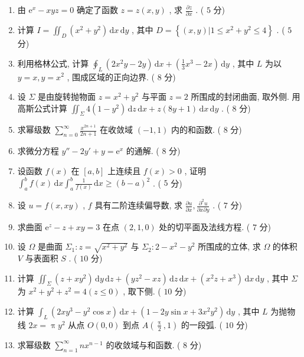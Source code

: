 \documentclass[cn,11pt,fancy,hide]{elegantbook}
\newcommand{\ee}{\mathrm{e}}
\newcommand{\dd}{\,\mathrm{d}}
\renewcommand{\leq}{\leqslant}
\renewcommand{\geq}{\geqslant}
\begin{document}
\begin{enumerate}
	\item 由 $\ee^{x}-x y z=0$ 确定了函数 $z=z(x,y)$ , 求 $\frac{\partial z}{\partial x}$ . ( $5$ 分)
	
	\item 计算 $I=\iint_{D}\left(x^{2}+y^{2}\right) \dd x \dd y$ , 其中 $D=\left\{(x, y) | 1 \leq x^{2}+y^{2} \leq 4\right\}$ . ( $5$ 分)
	
	\item 利用格林公式, 计算 $\oint_{L}\left(2 x^{2} y-2 y\right) \dd x+\left(\frac{1}{3} x^{3}-2 x\right) \dd y$ , 其中 $L$ 为以 $y=x,y=x^{2}$ , 围成区域的正向边界. ( $8$ 分)
	
	\item 设 $\Sigma$ 是由旋转抛物面 $z=x^{2}+y^{2}$ 与平面 $z=2$ 所围成的封闭曲面, 取外侧. 用高斯公式计算 $\iint_{\Sigma} 4\left(1-y^{2}\right) \dd z \dd x+z(8 y+1) \dd x \dd y$ . ( $8$ 分)
	
	\item 求幂级数 $\sum_{n=0}^{\infty} \frac{x^{2 n+1}}{2 n+1}$ 在收敛域 $(-1,1)$ 内的和函数. ( $8$ 分)
	
	\item 求微分方程 $y''-2 y'+y=\ee^{x}$ 的通解. ( $8$ 分)
	
	\item 设函数 $f(x)$ 在 $[a,b]$ 上连续且 $f(x)>0$ , 证明 $\int_{a}^{b} f(x) \dd x \int_{a}^{b} \frac{1}{f(x)} \dd x \geq(b-a)^{2}$ . ( $5$ 分)

	\item 设 $u=f(x,xy)$ , $f$ 具有二阶连续偏导数, 求 $\frac{\partial u}{\partial x},\frac{\partial^2u}{\partial x\partial y}$ . ( $7$ 分)
	
	\item 求曲面 $\ee^{z}-z+x y=3$ 在点 $(2,1,0)$ 处的切平面及法线方程. ( $7$ 分)
	
	\item 设 $\Omega$ 是曲面 $\Sigma_1:z=\sqrt{x^2+y^2}$ 与 $\Sigma_2:2-x^2-y^2$ 所围成的立体, 求 $\Omega$ 的体积 $V$ 与表面积 $S$ . ( $10$ 分)
	
	\item 计算 $\iint_{\Sigma}\left(z+x y^{2}\right) \dd y \dd z+\left(y z^{2}-x z\right) \dd z \dd x+\left(x^{2} z+x^{3}\right) \dd x \dd y$ , 其中 $\Sigma$ 为 $x^{2}+y^{2}+z^{2}=4(z \leq 0)$ , 取下侧. ( $10$ 分)
	
	\item 计算 $\int_{L}\left(2 x y^{3}-y^{2} \cos x\right) \dd x+\left(1-2 y \sin x+3 x^{2} y^{2}\right) \dd y$ , 其中 $L$ 为抛物线 $2x=\uppi y^2$ 从点 $O(0,0)$ 到点 $A\left( \frac{\uppi}{2},1 \right)$ 的一段弧. ( $10$ 分)
	
	\item 求幂级数 $\sum_{n=1}^{\infty}nx^{n-1}$ 的收敛域与和函数. ( $8$ 分)
\end{enumerate}
\end{document}
